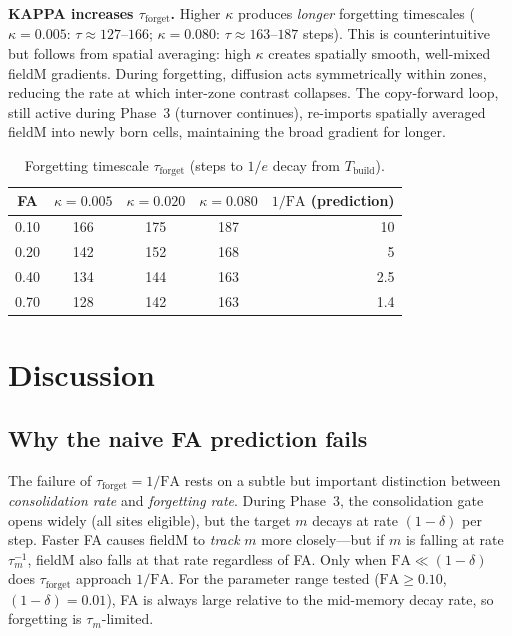 \documentclass[11pt]{article}
\begin{document}
\textbf{KAPPA increases $\tau_{\mathrm{forget}}$.}
Higher $\kappa$ produces \emph{longer} forgetting timescales
($\kappa=0.005$: $\tau \approx 127$--$166$; $\kappa=0.080$: $\tau \approx 163$--$187$ steps).
This is counterintuitive but follows from spatial averaging:
high $\kappa$ creates spatially smooth, well-mixed fieldM gradients.
During forgetting, diffusion acts symmetrically within zones, reducing the rate at which
inter-zone contrast collapses.
The copy-forward loop, still active during Phase~3 (turnover continues),
re-imports spatially averaged fieldM into newly born cells,
maintaining the broad gradient for longer.

\begin{table}[ht]
\centering
\caption{Forgetting timescale $\tau_{\mathrm{forget}}$ (steps to $1/e$ decay from $T_{\mathrm{build}}$).}
\label{tab:tau}
\begin{tabular}{ccccr}
\toprule
FA  & $\kappa=0.005$ & $\kappa=0.020$ & $\kappa=0.080$ & $1/\mathrm{FA}$ (prediction) \\
\midrule
0.10 & 166 & 175 & 187 & 10 \\
0.20 & 142 & 152 & 168 & 5  \\
0.40 & 134 & 144 & 163 & 2.5 \\
0.70 & 128 & 142 & 163 & 1.4 \\
\bottomrule
\end{tabular}
\end{table}

\section{Discussion}

\subsection{Why the naive FA prediction fails}

The failure of $\tau_{\mathrm{forget}} = 1/\mathrm{FA}$ rests on a subtle but important
distinction between \emph{consolidation rate} and \emph{forgetting rate}.
During Phase~3, the consolidation gate opens widely (all sites eligible),
but the target $m$ decays at rate $(1-\delta)$ per step.
Faster FA causes fieldM to \emph{track} $m$ more closely---but if $m$ is falling at
rate $\tau_m^{-1}$, fieldM also falls at that rate regardless of FA.
Only when $\mathrm{FA} \ll (1-\delta)$ does $\tau_{\mathrm{forget}}$ approach $1/\mathrm{FA}$.
For the parameter range tested ($\mathrm{FA} \geq 0.10$, $(1-\delta)=0.01$), FA is
always large relative to the mid-memory decay rate, so forgetting is $\tau_m$-limited.
\end{document}

